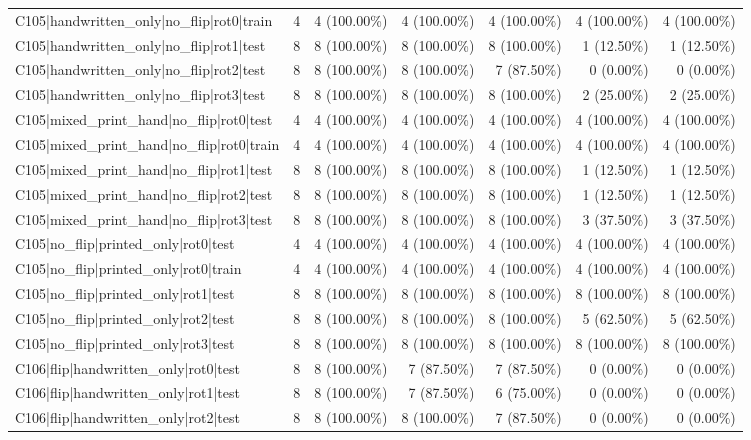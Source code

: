 \begin{longtable}{>{\raggedright\arraybackslash}p{5cm}rrrrrr}
C105|handwritten\_only|no\_flip|rot0|train & 4 & 4 (100.00\%) & 4 (100.00\%) & 4 (100.00\%) & 4 (100.00\%) & 4 (100.00\%) \\
C105|handwritten\_only|no\_flip|rot1|test & 8 & 8 (100.00\%) & 8 (100.00\%) & 8 (100.00\%) & 1 (12.50\%) & 1 (12.50\%) \\
C105|handwritten\_only|no\_flip|rot2|test & 8 & 8 (100.00\%) & 8 (100.00\%) & 7 (87.50\%) & 0 (0.00\%) & 0 (0.00\%) \\
C105|handwritten\_only|no\_flip|rot3|test & 8 & 8 (100.00\%) & 8 (100.00\%) & 8 (100.00\%) & 2 (25.00\%) & 2 (25.00\%) \\
C105|mixed\_print\_hand|no\_flip|rot0|test & 4 & 4 (100.00\%) & 4 (100.00\%) & 4 (100.00\%) & 4 (100.00\%) & 4 (100.00\%) \\
C105|mixed\_print\_hand|no\_flip|rot0|train & 4 & 4 (100.00\%) & 4 (100.00\%) & 4 (100.00\%) & 4 (100.00\%) & 4 (100.00\%) \\
C105|mixed\_print\_hand|no\_flip|rot1|test & 8 & 8 (100.00\%) & 8 (100.00\%) & 8 (100.00\%) & 1 (12.50\%) & 1 (12.50\%) \\
C105|mixed\_print\_hand|no\_flip|rot2|test & 8 & 8 (100.00\%) & 8 (100.00\%) & 8 (100.00\%) & 1 (12.50\%) & 1 (12.50\%) \\
C105|mixed\_print\_hand|no\_flip|rot3|test & 8 & 8 (100.00\%) & 8 (100.00\%) & 8 (100.00\%) & 3 (37.50\%) & 3 (37.50\%) \\
C105|no\_flip|printed\_only|rot0|test & 4 & 4 (100.00\%) & 4 (100.00\%) & 4 (100.00\%) & 4 (100.00\%) & 4 (100.00\%) \\
C105|no\_flip|printed\_only|rot0|train & 4 & 4 (100.00\%) & 4 (100.00\%) & 4 (100.00\%) & 4 (100.00\%) & 4 (100.00\%) \\
C105|no\_flip|printed\_only|rot1|test & 8 & 8 (100.00\%) & 8 (100.00\%) & 8 (100.00\%) & 8 (100.00\%) & 8 (100.00\%) \\
C105|no\_flip|printed\_only|rot2|test & 8 & 8 (100.00\%) & 8 (100.00\%) & 8 (100.00\%) & 5 (62.50\%) & 5 (62.50\%) \\
C105|no\_flip|printed\_only|rot3|test & 8 & 8 (100.00\%) & 8 (100.00\%) & 8 (100.00\%) & 8 (100.00\%) & 8 (100.00\%) \\
C106|flip|handwritten\_only|rot0|test & 8 & 8 (100.00\%) & 7 (87.50\%) & 7 (87.50\%) & 0 (0.00\%) & 0 (0.00\%) \\
C106|flip|handwritten\_only|rot1|test & 8 & 8 (100.00\%) & 7 (87.50\%) & 6 (75.00\%) & 0 (0.00\%) & 0 (0.00\%) \\
C106|flip|handwritten\_only|rot2|test & 8 & 8 (100.00\%) & 8 (100.00\%) & 7 (87.50\%) & 0 (0.00\%) & 0 (0.00\%) \\

\end{longtable}
